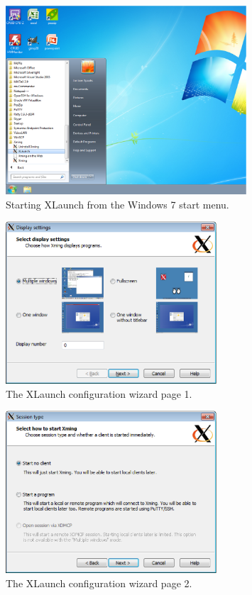\begin{figure}[H]
  \centering
    \includegraphics[width=0.8\textwidth]{./../eps/xlaunch-1.eps}
  \caption{Starting XLaunch from the Windows 7 start menu.}
  \label{fig:xlaunch-0}
\end{figure}


\begin{figure}[H]
  \centering
    \includegraphics[width=0.7\textwidth]{./../eps/xlaunch-2.eps}
  \caption{The XLaunch configuration wizard page 1.}
  \label{fig:xlaunch-1}
\end{figure}

\begin{figure}[H]
  \centering
    \includegraphics[width=0.7\textwidth]{./../eps/xlaunch-3.eps}
  \caption{The XLaunch configuration wizard page 2.}
  \label{fig:xlaunch-2}
\end{figure}

